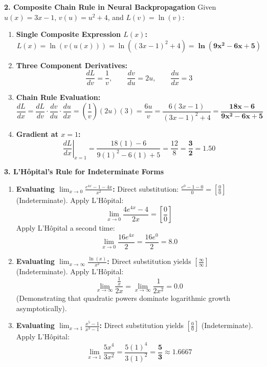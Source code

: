 \textbf{2. Composite Chain Rule in Neural Backpropagation}
Given $u(x) = 3x - 1$, $v(u) = u^2 + 4$, and $L(v) = \ln(v)$:
\begin{enumerate}
    \item \textbf{Single Composite Expression $L(x)$:}
    $$L(x) = \ln(v(u(x))) = \ln((3x - 1)^2 + 4) = \mathbf{\ln(9x^2 - 6x + 5)}$$
    \item \textbf{Three Component Derivatives:}
    $$\frac{dL}{dv} = \frac{1}{v}, \qquad \frac{dv}{du} = 2u, \qquad \frac{du}{dx} = 3$$
    \item \textbf{Chain Rule Evaluation:}
    $$\frac{dL}{dx} = \frac{dL}{dv} \cdot \frac{dv}{du} \cdot \frac{du}{dx} = \left(\frac{1}{v}\right)(2u)(3) = \frac{6u}{v} = \frac{6(3x - 1)}{(3x - 1)^2 + 4} = \mathbf{\frac{18x - 6}{9x^2 - 6x + 5}}$$
    \item \textbf{Gradient at $x = 1$:}
    $$\left.\frac{dL}{dx}\right|_{x=1} = \frac{18(1) - 6}{9(1)^2 - 6(1) + 5} = \frac{12}{8} = \mathbf{\frac{3}{2} = 1.50}$$
\end{enumerate}

\textbf{3. L'Hôpital's Rule for Indeterminate Forms}
\begin{enumerate}
    \item \textbf{Evaluating $\lim_{x \to 0} \frac{e^{4x} - 1 - 4x}{x^2}$:}
    Direct substitution: $\frac{e^0 - 1 - 0}{0} = \left[\frac{0}{0}\right]$ (Indeterminate). Apply L'Hôpital:
    $$\lim_{x \to 0} \frac{4e^{4x} - 4}{2x} = \left[\frac{0}{0}\right]$$
    Apply L'Hôpital a second time:
    $$\lim_{x \to 0} \frac{16e^{4x}}{2} = \frac{16e^0}{2} = \mathbf{8.0}$$
    \item \textbf{Evaluating $\lim_{x \to \infty} \frac{\ln(x)}{x^2}$:}
    Direct substitution yields $\left[\frac{\infty}{\infty}\right]$ (Indeterminate). Apply L'Hôpital:
    $$\lim_{x \to \infty} \frac{\frac{1}{x}}{2x} = \lim_{x \to \infty} \frac{1}{2x^2} = \mathbf{0.0}$$
    (Demonstrating that quadratic powers dominate logarithmic growth asymptotically).
    \item \textbf{Evaluating $\lim_{x \to 1} \frac{x^5 - 1}{x^3 - 1}$:}
    Direct substitution yields $\left[\frac{0}{0}\right]$ (Indeterminate). Apply L'Hôpital:
    $$\lim_{x \to 1} \frac{5x^4}{3x^2} = \frac{5(1)^4}{3(1)^2} = \mathbf{\frac{5}{3} \approx 1.6667}$$
\end{enumerate}

